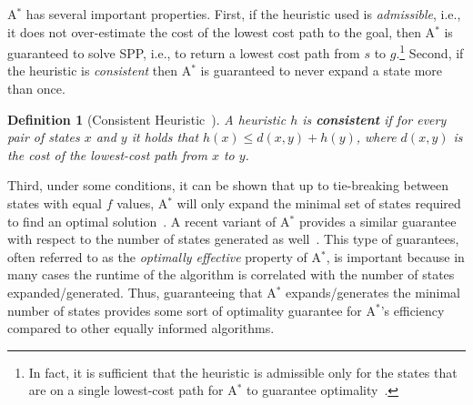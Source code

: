 \documentclass{aicom2e}
\newtheorem{definition}{Definition}
\newcommand{\astar}{A$^*$}
\newcommand{\roni}[1]{\textbf{[RS:#1]}}
\begin{document}
\astar{} has several important properties. First, if the heuristic used is {\em
admissible}, i.e., it does not over-estimate the cost of the lowest cost path
to the goal, then \astar{} is guaranteed to solve SPP, i.e., to return a lowest
cost path from $s$ to $g$.\footnote{In fact, it is sufficient that the
heuristic is admissible only for the states that are on a single lowest-cost
path for \astar{} to guarantee
optimality~\cite{karpas2012optimal,dechter1985generalizedBestFirst}.} Second,
if the heuristic is {\em consistent} then \astar{} is guaranteed to never
expand a state more than once.
\begin{definition}[Consistent Heuristic~\cite{hartNR68Astar}]
    A heuristic $h$ is {\bf consistent} if for every pair of states $x$ and $y$
    it holds that $h(x)\leq d(x,y)+h(y)$, where $d(x, y)$ is
    the cost of the lowest-cost path from $x$ to $y$.
    \label{def:consistent}
\end{definition}




Third, under some conditions, it can be shown that up to tie-breaking between
states with equal $f$ values, \astar{} will only expand the minimal set of
states required to find an optimal
solution~\cite{dechter1985generalizedBestFirst}. A recent variant of \astar{}
provides a similar guarantee with respect to the number of states generated as
well~\cite{goldenberg2014enhanced}. This type of guarantees, often referred to
as the {\em optimally effective} property of \astar{}, is  important because in
many cases the runtime of the algorithm is correlated with the number of states
expanded/generated. Thus, guaranteeing that \astar{} expands/generates the
minimal number of states provides some sort of optimality guarantee for
\astar{}'s efficiency compared to other equally informed algorithms.

\end{document}
